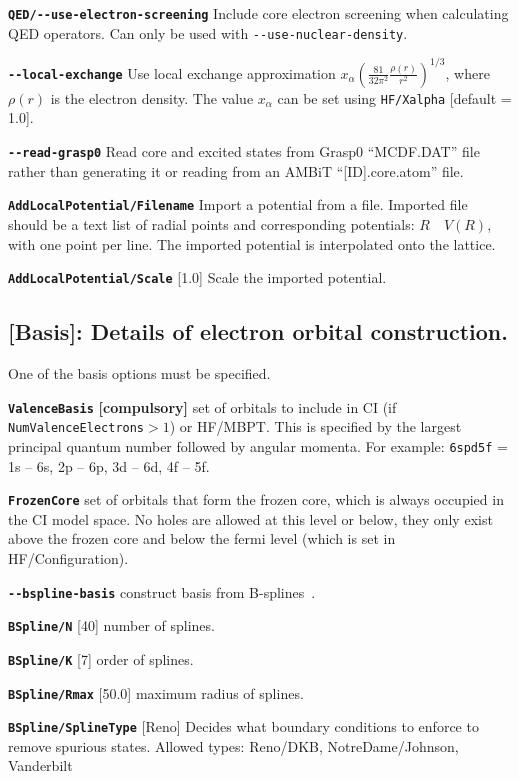 \documentclass[a4paper,11pt]{article}
\newcommand{\option}[1]{\smallskip\noindent\textbf{\texttt{#1}}}
\newcommand{\code}[1]{\texttt{#1}}
\begin{document}
\option{QED/-{}-use-electron-screening} Include core electron screening when calculating QED operators. Can only be used with \code{-{}-use-nuclear-density}.

\option{-{}-local-exchange} Use local exchange approximation $x_\alpha \left(\frac{81}{32\pi^2} \frac{\rho(r)}{r^2}\right)^{1/3}$, where $\rho(r)$ is the electron density. The value $x_\alpha$ can be set using \code{HF/Xalpha} [default = 1.0].

\option{-{}-read-grasp0} Read core and excited states from Grasp0 ``MCDF.DAT'' file rather than generating it or reading from an AMBiT ``[ID].core.atom'' file.

\option{AddLocalPotential/Filename} Import a potential from a file. Imported file should be a text list of radial points and corresponding potentials: $R \quad V(R)$, with one point per line. The imported potential is interpolated onto the lattice.

\option{AddLocalPotential/Scale} [1.0] Scale the imported potential.

\subsection{[Basis]: Details of electron orbital construction.}
One of the basis options must be specified.

\option{ValenceBasis} \textbf{[compulsory]} set of orbitals to include in CI (if \mbox{\texttt{NumValenceElectrons}$>1$}) or HF/MBPT. This is specified by the largest principal quantum number followed by angular momenta. For example:
\texttt{6spd5f} = 1s -- 6s, 2p -- 6p, 3d -- 6d, 4f -- 5f.

\option{FrozenCore} set of orbitals that form the frozen core, which is always occupied in the CI model space. No holes are allowed at this level or below, they only exist above the frozen core and below the fermi level (which is set in HF/Configuration).

\option{-{}-bspline-basis} construct basis from B-splines~\cite{johnson88pra}.

\option{BSpline/N} [40] number of splines.

\option{BSpline/K} [7]  order of splines.

\option{BSpline/Rmax} [50.0] maximum radius of splines.

\option{BSpline/SplineType} [Reno] Decides what boundary conditions to enforce to remove spurious states. Allowed types: Reno/DKB, NotreDame/Johnson, Vanderbilt
\end{document}
